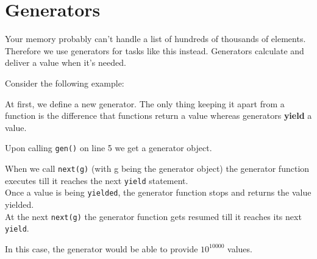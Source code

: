 \section{Generators}
    Your memory probably can't handle a list of hundreds of thousands of elements.
    Therefore we use generators for tasks like this instead.
    Generators calculate and deliver a value when it's needed.
    
    Consider the following example:

    
    At first, we define a new generator.
    The only thing keeping it apart from a function is the difference that functions return a
    value whereas generators \textbf{yield} a value.
    
    Upon calling \texttt{gen()} on line 5 we get a generator object.
    
    When we call \texttt{next(g)} (with g being the generator object) the generator
    function executes till it reaches the next \texttt{yield} statement.\\
    Once a value is being \texttt{yielded}, the generator function stops and returns
    the value yielded.\\
    At the next \texttt{next(g)} the generator function gets resumed till it reaches
    its next \texttt{yield}.
    
    In this case, the generator would be able to provide \( 10^{10000} \) values.
    
    